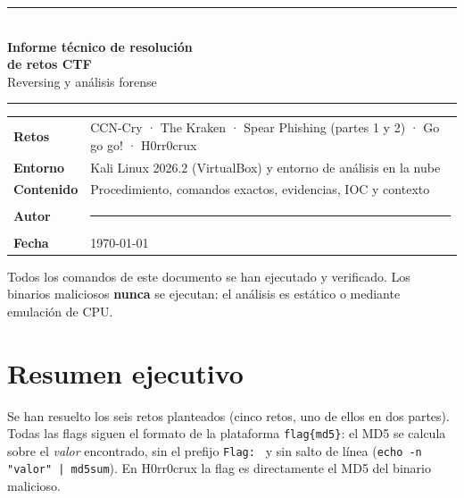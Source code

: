 \documentclass[11pt,a4paper]{article}
\newcommand{\autor}{\rule{6cm}{0.4pt}}  %
\begin{document}
\begin{titlepage}
\centering
\vspace*{2cm}
{\color{titulo}\rule{\linewidth}{1.2pt}\\[0.6cm]
{\Huge\bfseries Informe técnico de resolución\\[0.25cm] de retos CTF}\\[0.4cm]
{\Large Reversing y análisis forense}\\[0.4cm]
\rule{\linewidth}{1.2pt}}
\vspace{1.5cm}

\begin{tcolorbox}[enhanced, colback=gray!4, colframe=titulo, boxrule=0.6pt, arc=3pt, width=0.85\linewidth]
\begin{tabularx}{\linewidth}{@{}lX@{}}
\textbf{Retos} & CCN-Cry · The Kraken · Spear Phishing (partes 1 y 2) · Go go go! · H0rr0crux \\[2pt]
\textbf{Entorno} & Kali Linux 2026.2 (VirtualBox) y entorno de análisis en la nube \\[2pt]
\textbf{Contenido} & Procedimiento, comandos exactos, evidencias, IOC y contexto \\[2pt]
\textbf{Autor} & \autor \\[2pt]
\textbf{Fecha} & \today \\
\end{tabularx}
\end{tcolorbox}

\vfill
{\small Todos los comandos de este documento se han ejecutado y verificado. Los binarios maliciosos
\textbf{nunca} se ejecutan: el análisis es estático o mediante emulación de CPU.}
\end{titlepage}

\section*{Resumen ejecutivo}

Se han resuelto los seis retos planteados (cinco retos, uno de ellos en dos partes). Todas las flags siguen el
formato de la plataforma \texttt{flag\{md5\}}: el MD5 se calcula sobre el \emph{valor} encontrado, sin el prefijo
\texttt{Flag:~} y sin salto de línea (\texttt{echo -n "valor" | md5sum}). En H0rr0crux la flag es directamente el
MD5 del binario malicioso.
\end{document}
